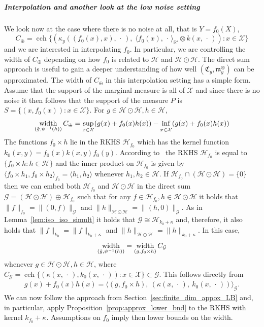 \documentclass[AHL,Unicode,longabstracts,published]{cedram}
\theoremstyle{remark}
\DeclareMathOperator*{\infd}{inf\vphantom{p}}
\DeclareMathOperator{\cch}{cch}
\DeclareMathOperator{\diam}{width}
\newcommand{\R}{\mathbb{R}}
\newcommand{\dR}{{\R'}}
\newcommand{\X}{\mathcal{X}}
\newcommand{\cH}{\mathcal{H}}
\newcommand{\clG}{\mathcal{G}}
\newcommand{\fkC}{\mathfrak{C}}
\newcommand{\mean}{\mathfrak{m}}
\let\oldhat\hat
\renewcommand*{\hat}[1]{\mathchoice{\widehat{#1}}{\widehat{#1}}{\oldhat{#1}}{\oldhat{#1}}}
\let\originalleft\left
\let\originalright\right
\renewcommand{\left}{\mathopen{}\mathclose\bgroup\originalleft}
\renewcommand{\right}{\aftergroup\egroup\originalright}
\begin{document}
\subparagraph{Interpolation and another look at the low noise setting} \label{sec:simul_interpol}
We look now at the case where there is no noise at all, that is $Y = f_0(X)$,
\[
C_\oplus = \cch\bigl\{(\kappa_y((f_0(x),x),\,\cdot\,),\; \langle f_0(x),\,\cdot\, \rangle_{\dR} \otimes k(x,\,\cdot\,)) : x\in \X \bigr\}
\]
and we are interested in interpolating $f_0$. In particular, we are controlling the width of $C_\oplus$ depending on how $f_0$ is related to $\cH$ and $\cH \odot \cH$. The direct sum approach is useful to gain a deeper understanding of how well $(\fkC_y, \mean_y^\otimes)$ can be approximated. The width of $C_\oplus$ in this interpolation setting has a simple form. Assume that the support of the marginal measure is all of $\X$ and since there is no noise it then follows that the support of the measure $P$ is $S = \{ (x, f_0(x)) : x \in \X\}$. For $g \in \cH \odot \cH, h \in \cH$,
\[
\diam_{\left(\hat g,\psi^{-1}(h)\right)} C_\oplus = \sup_{x\in\X} (g(x) + f_0(x) h(x)) - \infd_{x\in \X} (g(x) + f_0(x)h(x))
\]
The functions $f_0 \times h$ lie in the RKHS $\cH_{f_0}$ which has the kernel function $k_0(x,y) = f_0(x) k(x,y) f_0(y)$. According to~\cite[Proposition~5.20]{PAUL16} the RKHS $\cH_{f_0}$ is equal to $\{f_0 \times h : h \in \cH\}$ and the inner product on $\cH_{f_0}$ is given by $ \langle f_0 \times h_1, f_0 \times h_2\rangle_{f_0} = \langle h_1,h_2 \rangle$ whenever $h_1,h_2 \in \cH$. If $\cH_{f_0} \cap (\cH \odot \cH) = \{0\}$ then we can embed both $\cH_{f_0}$ and $\cH \odot \cH$ in the direct sum $\clG = (\cH \odot \cH) \oplus \cH_{f_0}$ such that for any $f \in \cH_{f_0}, h \in \cH \odot \cH$ it holds that $\|f\|_{f_0} = \|(0,f)\|_{\clG}$ and $\|h \|_{\cH \odot \cH} = \|(h,0)\|_{\clG}$. As in Lemma~\ref{lem:iso_iso_simult} it holds that $\clG \cong \cH_{k_0 + \kappa}$ and, therefore, it also holds that $\|f\|_{k_0} = \|f\|_{k_0 + \kappa}$ and $\|h\|_{\cH \odot \cH} = \|h\|_{k_0 + \kappa}$. In this case,
\[
\diam_{\left(\hat g,\psi^{-1}(h)\right)} = \diam_{(g, f_0 \times h)} C_\clG
\]
whenever $g\in \cH\odot \cH, h \in \cH$, where $C_\clG = \cch \{ (\kappa(x,\,\cdot\,), k_0(x,\,\cdot\,)) : x \in \X \} \subset \clG$. This follows directly from
\begin{align*}
g(x) + f_0(x) h(x) = \bigl\langle (g,f_0 \times h),\: (\kappa(x,\,\cdot\,),\: k_0(x,\,\cdot\,)) \bigr\rangle_\clG.
\end{align*}
We can now follow the approach from Section~\ref{sec:finite_dim_appox_LB} and, in particular, apply Proposition~\ref{prop:approx_lower_bnd} to the RKHS with kernel $k_{f_0} + \kappa$. Assumptions on $f_0$ imply then lower bounds on the width.
\end{document}
